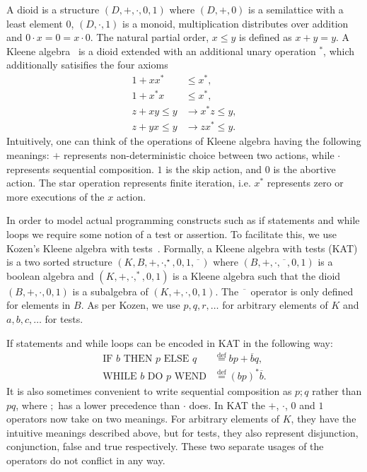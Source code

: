 \documentclass{llncs}
\newcommand{\nkat}{\overline{\phantom{x}}}
\newcommand{\ifthenelse}[3]{\text{IF $#1$ THEN $#2$ ELSE $#3$}}
\newcommand{\while}[2]{\text{WHILE $#1$ DO $#2$ WEND}}
\begin{document}
A dioid is a structure $(D, +, \cdot, 0, 1)$ where $(D, +, 0)$ is a
semilattice with a least element $0$, $(D, \cdot, 1)$ is a monoid,
multiplication distributes over addition and $0\cdot x = 0 = x\cdot
0$. The natural partial order, $x \le y$ is defined as $x + y = y$. A
Kleene algebra~\cite{Kozen} is a dioid extended with an additional
unary operation $^\ast$, which additionally satisifies the four axioms
\begin{align*}
1 + xx^\ast &\le x^\ast,\\
1 + x^\ast x &\le x^\ast,\\
z + xy \le y &\to x^\ast z \le y,\\
z + yx \le y &\to zx^\ast \le y.
\end{align*}
Intuitively, one can think of the operations of Kleene algebra having
the following meanings: $+$ represents non-deterministic choice
between two actions, while $\cdot$ represents sequential
composition. $1$ is the skip action, and $0$ is the abortive
action. The star operation represents finite iteration, i.e. $x^\ast$
represents zero or more executions of the $x$ action.

In order to model actual programming constructs such as if statements
and while loops we require some notion of a test or assertion. To
facilitate this, we use Kozen's Kleene algebra with
tests~\cite{Kozen97}. Formally, a Kleene algebra with tests (KAT) is
a two sorted structure $(K,B,+,\cdot,^\star,0,1,\nkat)$ where
$(B,+,\cdot,\nkat,0,1)$ is a boolean algebra and
$(K,+,\cdot,^\ast,0,1)$ is a Kleene algebra such that the dioid
$(B,+,\cdot,0,1)$ is a subalgebra of $(K,+,\cdot,0,1)$. The $\nkat$
operator is only defined for elements in $B$. As per Kozen, we use
$p,q,r,\dots$ for arbitrary elements of $K$ and $a,b,c,\dots$ for
tests.

If statements and while loops can be encoded in KAT in the following way:
\begin{align*}
\ifthenelse{b}{p}{q} &\overset{\text{def}}{=} bp + \overline{b}q,\\
\while{b}{p} &\overset{\text{def}}{=} (bp)^\ast \overline{b}.
\end{align*}
It is also sometimes convenient to write sequential composition as $p;
q$ rather than $pq$, where $;$ has a lower precedence than $\cdot$
does. In KAT the $+$, $\cdot$, $0$ and $1$ operators now take on two
meanings. For arbitrary elements of $K$, they have the intuitive
meanings described above, but for tests, they also represent
disjunction, conjunction, false and true respectively. These two
separate usages of the operators do not conflict in any way.
\end{document}
